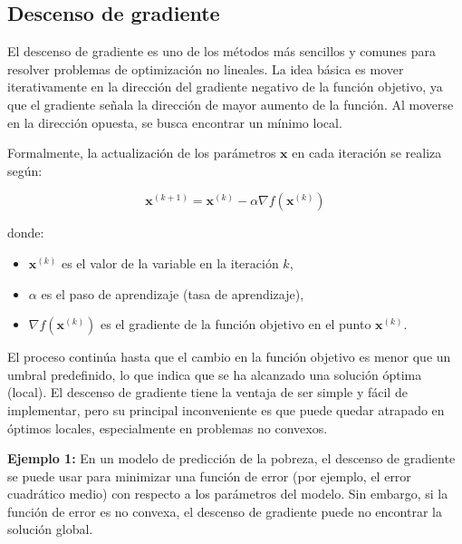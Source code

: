 \subsection{Descenso de gradiente}

\begin{flushleft}
	El descenso de gradiente es uno de los métodos más sencillos y comunes para resolver problemas de optimización no lineales. La idea básica es mover iterativamente en la dirección del gradiente negativo de la función objetivo, ya que el gradiente señala la dirección de mayor aumento de la función. Al moverse en la dirección opuesta, se busca encontrar un mínimo local.
\end{flushleft}

\begin{flushleft}
	Formalmente, la actualización de los parámetros $\mathbf{x}$ en cada iteración se realiza según:
\end{flushleft}

$$
\mathbf{x}^{(k+1)}=\mathbf{x}^{(k)}-\alpha \nabla f\left(\mathbf{x}^{(k)}\right)
$$

\begin{flushleft}
	donde:
\end{flushleft}

\begin{itemize}
	\item $\mathbf{x}^{(k)}$ es el valor de la variable en la iteración $k$,
	\item $\alpha$ es el paso de aprendizaje (tasa de aprendizaje),
	\item $\nabla f\left(\mathbf{x}^{(k)}\right)$ es el gradiente de la función objetivo en el punto $\mathbf{x}^{(k)}$.
\end{itemize}

\begin{flushleft}
	El proceso continúa hasta que el cambio en la función objetivo es menor que un umbral predefinido, lo que indica que se ha alcanzado una solución óptima (local). El descenso de gradiente tiene la ventaja de ser simple y fácil de implementar, pero su principal inconveniente es que puede quedar atrapado en óptimos locales, especialmente en problemas no convexos.
\end{flushleft}

\begin{flushleft}
	\textbf{Ejemplo 1:} En un modelo de predicción de la pobreza, el descenso de gradiente se puede usar para minimizar una función de error (por ejemplo, el error cuadrático medio) con respecto a los parámetros del modelo. Sin embargo, si la función de error es no convexa, el descenso de gradiente puede no encontrar la solución global.
\end{flushleft}

